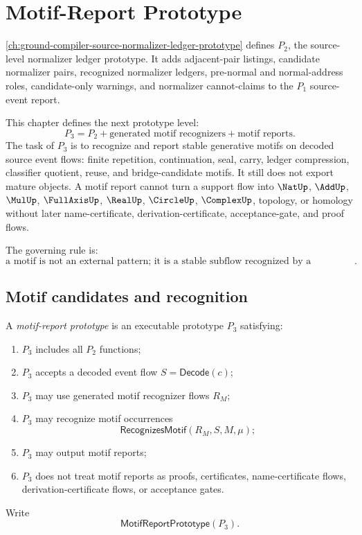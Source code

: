 \chapter{Motif-Report Prototype}
\label{ch:ground-compiler-motif-report-prototype}

\autoref{ch:ground-compiler-source-normalizer-ledger-prototype} defines $P_2$, the source-level normalizer ledger prototype. It adds adjacent-pair listings, candidate normalizer pairs, recognized normalizer ledgers, pre-normal and normal-address roles, candidate-only warnings, and normalizer cannot-claims to the $P_1$ source-event report.

This chapter defines the next prototype level:
$$
  \boxed{P_3=P_2+\text{generated motif recognizers}+\text{motif reports}.}
$$
The task of $P_3$ is to recognize and report stable generative motifs on decoded source event flows: finite repetition, continuation, seal, carry, ledger compression, classifier quotient, reuse, and bridge-candidate motifs. It still does not export mature objects. A motif report cannot turn a support flow into $\NatUp$, $\AddUp$, $\MulUp$, $\FullAxisUp$, $\RealUp$, $\CircleUp$, $\ComplexUp$, topology, or homology without later name-certificate, derivation-certificate, acceptance-gate, and proof flows.

The governing rule is:
$$
  \boxed{\text{a motif is not an external pattern; it is a stable subflow recognized by a generated recognizer}.}
$$

\section{Motif candidates and recognition}
\label{sec:motif-report-candidates-recognition}

\begin{definition}
\label{def:motif-report-prototype}
A \emph{motif-report prototype} is an executable prototype $P_3$ satisfying:
\begin{enumerate}
\item $P_3$ includes all $P_2$ functions;
\item $P_3$ accepts a decoded event flow $S=\mathsf{Decode}(c)$;
\item $P_3$ may use generated motif recognizer flows $R_M$;
\item $P_3$ may recognize motif occurrences
$$
  \mathsf{RecognizesMotif}(R_M,S,M,\mu);
$$
\item $P_3$ may output motif reports;
\item $P_3$ does not treat motif reports as proofs, certificates, name-certificate flows, derivation-certificate flows, or acceptance gates.
\end{enumerate}
Write
$$
  \mathsf{MotifReportPrototype}(P_3).
$$
\end{definition}

